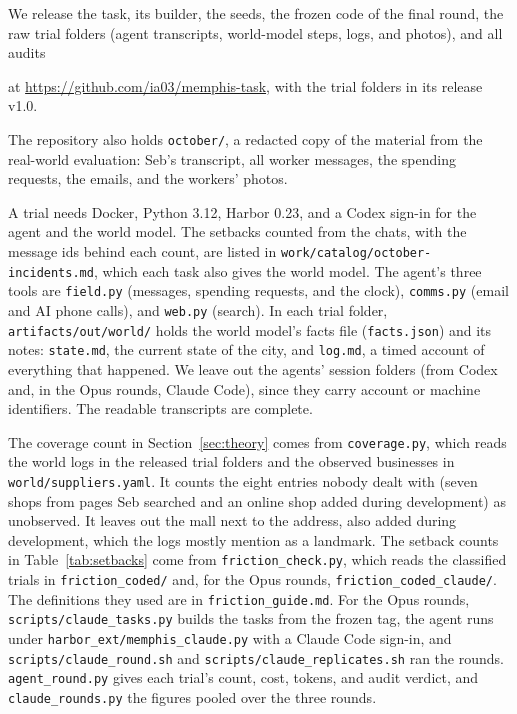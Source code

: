 \documentclass[10pt]{article}
\newif\ifanonymous
\begin{document}
We release the task, its builder, the seeds, the frozen code of the final round, the raw trial folders (agent transcripts,
world-model steps, logs, and photos), and all audits
\ifanonymous
as supplementary material with this submission. For review, the release replaces names and details that would identify the
authors or other people (Appendix~\ref{app:release}). To fit the 100\,MB limit for supplementary material, this copy leaves out all images and the ten built tasks of the final round, which \texttt{build\_task.py} rebuilds from the source. The full release, with the authors' names, follows review.
\else
at \url{https://github.com/ia03/memphis-task}, with the trial folders in its release v1.0.
\fi
\ifanonymous
This copy holds the chats as the task uses them (\texttt{work/catalog/}). The full release adds a redacted copy of the material from the real-world evaluation: Seb's transcript, all worker messages, the spending requests, the emails, and the workers' photos.
\else
The repository also holds \texttt{october/}, a redacted copy of the material from the real-world evaluation: Seb's transcript, all worker messages, the spending requests, the emails, and the workers' photos.
\fi
A trial needs Docker, Python 3.12, Harbor 0.23, and a Codex sign-in for the agent and the world model. The setbacks counted from the
chats, with the message ids behind each count, are listed in \texttt{work/catalog/october-incidents.md}, which each task also gives
the world model. The agent's three tools are \texttt{field.py} (messages, spending requests, and the clock), \texttt{comms.py} (email
and AI phone calls), and \texttt{web.py} (search). In each trial folder, \texttt{artifacts/out/world/} holds the world model's facts
file (\texttt{facts.json}) and its notes: \texttt{state.md}, the current state of the city, and \texttt{log.md}, a timed account of
everything that happened. We leave out the agents' session folders (from Codex and, in the Opus rounds, Claude Code), since they
carry account or machine identifiers. The readable transcripts are complete.

The coverage count in Section~\ref{sec:theory} comes from \texttt{coverage.py}, which reads the world logs in the released trial
folders and the observed businesses in \texttt{world/suppliers.yaml}. It counts the eight entries nobody dealt with (seven shops from pages Seb searched and an online shop added during development) as unobserved. It leaves out the mall next to the address, also added during development, which the logs mostly mention as a landmark. The setback counts in Table~\ref{tab:setbacks} come from \texttt{friction\_check.py}, which reads the classified
trials in \texttt{friction\_coded/} and, for the Opus rounds, \texttt{friction\_coded\_claude/}. The definitions they used are in
\texttt{friction\_guide.md}. For the Opus rounds, \texttt{scripts/claude\_tasks.py} builds the tasks from the frozen tag, the agent
runs under \texttt{harbor\_ext/memphis\_claude.py} with a Claude Code sign-in, and \texttt{scripts/claude\_round.sh} and
\texttt{scripts/claude\_replicates.sh} ran the rounds. \texttt{agent\_round.py} gives each trial's count, cost, tokens, and audit
verdict, and \texttt{claude\_rounds.py} the figures pooled over the three rounds.
\end{document}
